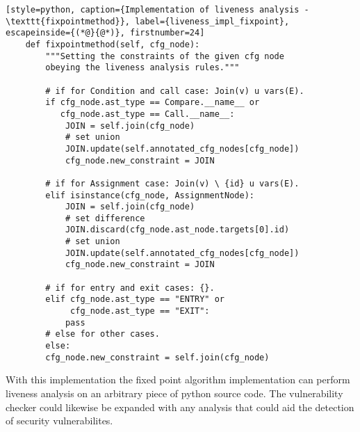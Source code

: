\begin{lstlisting}[style=python, caption={Implementation of liveness analysis - \texttt{fixpointmethod}}, label={liveness_impl_fixpoint}, escapeinside={(*@}{@*)}, firstnumber=24]
    def fixpointmethod(self, cfg_node):
        """Setting the constraints of the given cfg node
        obeying the liveness analysis rules."""
    
        # if for Condition and call case: Join(v) u vars(E).
        if cfg_node.ast_type == Compare.__name__ or
           cfg_node.ast_type == Call.__name__:
            JOIN = self.join(cfg_node)
            # set union
            JOIN.update(self.annotated_cfg_nodes[cfg_node])  
            cfg_node.new_constraint = JOIN

        # if for Assignment case: Join(v) \ {id} u vars(E).
        elif isinstance(cfg_node, AssignmentNode): 
            JOIN = self.join(cfg_node)
            # set difference
            JOIN.discard(cfg_node.ast_node.targets[0].id)
            # set union
            JOIN.update(self.annotated_cfg_nodes[cfg_node])  
            cfg_node.new_constraint = JOIN

        # if for entry and exit cases: {}.
        elif cfg_node.ast_type == "ENTRY" or
             cfg_node.ast_type == "EXIT":
            pass
        # else for other cases.
        else:
        cfg_node.new_constraint = self.join(cfg_node)
\end{lstlisting}

With this implementation the \pyt{} fixed point algorithm implementation can perform liveness analysis on an arbitrary piece of python source code.
The \pyt{} vulnerability checker could likewise be expanded with any analysis that could aid the detection of security vulnerabilites.
